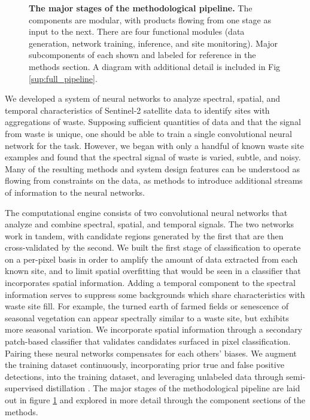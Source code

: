 \documentclass[10pt,letterpaper]{article}
\begin{document}
\begin{figure}[!h]
    \caption{{\bf The major stages of the methodological pipeline.}
    The components are modular, with products flowing from one stage as input to the next. There are four functional modules (data generation, network training, inference, and site monitoring). Major subcomponents of each shown and labeled for reference in the methods section. A diagram with additional detail is included in Fig \ref{sup:full_pipeline}.}
    \label{fig:major_pipeline}
\end{figure}

We developed a system of neural networks to analyze spectral, spatial, and temporal characteristics of Sentinel-2 satellite data to identify sites with aggregations of waste. Supposing sufficient quantities of data and that the signal from waste is unique, one should be able to train a single convolutional neural network for the task. However, we began with only a handful of known waste site examples and found that the spectral signal of waste is varied, subtle, and noisy. Many of the resulting methods and system design features can be understood as flowing from constraints on the data, as methods to introduce additional streams of information to the neural networks.

The computational engine consists of two convolutional neural networks that analyze and combine spectral, spatial, and temporal signals. The two networks work in tandem, with candidate regions generated by the first that are then cross-validated by the second. We built the first stage of classification to operate on a per-pixel basis in order to amplify the amount of data extracted from each known site, and to limit spatial overfitting that would be seen in a classifier that incorporates spatial information. Adding a temporal component to the spectral information serves to suppress some backgrounds which share characteristics with waste site fill. For example, the turned earth of farmed fields or senescence of seasonal vegetation \cite{heaton1987stomata} can appear spectrally similar to a waste site, but exhibits more seasonal variation. We incorporate spatial information through a secondary patch-based classifier that validates candidates surfaced in pixel classification. Pairing these neural networks compensates for each others’ biases. We augment the training dataset continuously, incorporating prior true and false positive detections, into the training dataset, and leveraging unlabeled data through semi-supervised distillation \cite{hinton2015distilling}. The major stages of the methodological pipeline are laid out in figure \ref{fig:major_pipeline} and explored in more detail through the component sections of the methods.
\end{document}
